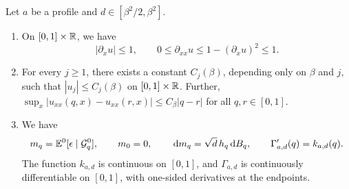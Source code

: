 \begin{lemma}\label{lem:sc-basic}
Let $a$ be a profile and $d\in[\beta^2/2,\beta^2]$.
\begin{enumerate}
\item[(a)] On $[0,1]\times\mathbb R$, we have
\begin{equation}\label{eq:sc-basic-bounds}
 |\partial_xu|\le1,\qquad
 0\le\partial_{xx}u\le1-(\partial_xu)^2\le1 .
\end{equation}
\item[(b)] For every $j\ge1$, there exists a constant $C_j(\beta)$,
depending only on $\beta$ and $j$, such that $|u_j|\le C_j(\beta)$ on
$[0,1]\times\mathbb R$. Further,
$\sup_x|u_{xx}(q,x)-u_{xx}(r,x)|\le C_\beta|q-r|$ for all
$q,r\in[0,1]$.
\item[(c)] We have
\begin{equation}\label{eq:sc-martingale}
 m_q=\mathbb E^0[\epsilon\mid\mathcal G_q^0],\qquad m_0=0,\qquad
 \,\mathrm d m_q=\sqrt d\,h_q\,\mathrm d B_q,\qquad \Gamma_{a,d}'(q)=k_{a,d}(q).
\end{equation}
The function $k_{a,d}$ is continuous on $[0,1]$, and $\Gamma_{a,d}$ is
continuously differentiable on $[0,1]$, with one-sided derivatives at
the endpoints.
\end{enumerate}
\end{lemma}

